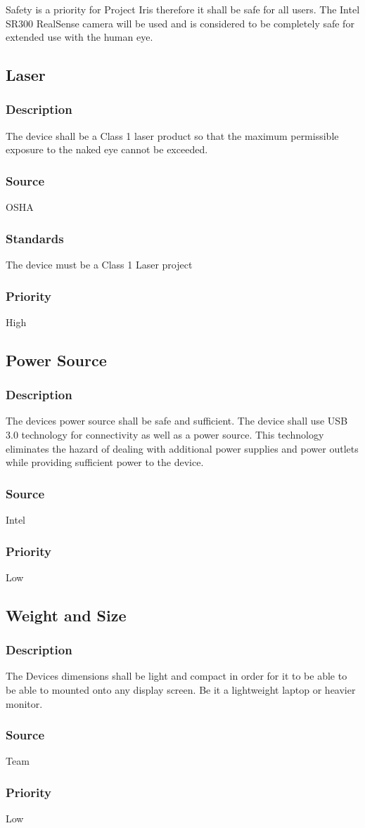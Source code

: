 Safety is a priority for Project Iris therefore it shall be safe for all users.  The Intel SR300 RealSense camera will be used and is considered to be completely safe for extended use with the human eye.  
\subsection{Laser}
\subsubsection{Description}
The device shall be a Class 1 laser product  so that the maximum permissible exposure to the naked eye cannot be exceeded.
\subsubsection{Source}
OSHA 
\subsubsection{Standards}
The device must be a Class 1 Laser project
\subsubsection{Priority}
High
\subsection{Power Source}
\subsubsection{Description}
The devices power source shall be safe and sufficient. The device shall use USB 3.0 technology for connectivity as well as a power source.  This technology eliminates the hazard of dealing with additional power supplies and power outlets while providing sufficient power to the device.
\subsubsection{Source}
Intel 
\subsubsection{Priority}
Low
\subsection{Weight and Size}
\subsubsection{Description}
The Devices dimensions shall be light and compact in order for it to be able to be able to mounted onto any display screen.  Be it a lightweight laptop or heavier monitor.
\subsubsection{Source}
Team
\subsubsection{Priority}
Low